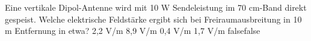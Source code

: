     {Eine vertikale Dipol-Antenne wird mit 10 W Sendeleistung im 70 cm-Band direkt gespeist. Welche elektrische Feldstärke ergibt sich bei Freiraumausbreitung in 10 m Entfernung in etwa?}
    {2,2 V/m}
    {8,9 V/m}
    {0,4 V/m}
    {1,7 V/m}
    {false}{false}